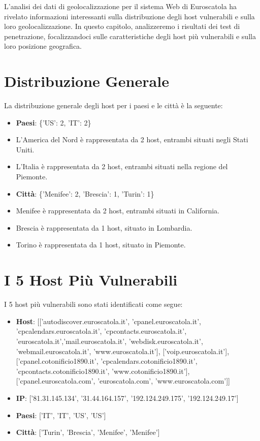 L'analisi dei dati di geolocalizzazione per il sistema Web di Euroscatola ha rivelato informazioni interessanti sulla distribuzione degli host vulnerabili e sulla loro geolocalizzazione. In questo capitolo, analizzeremo i risultati dei test di penetrazione, focalizzandoci sulle caratteristiche degli host più vulnerabili e sulla loro posizione geografica.

\section{Distribuzione Generale}

La distribuzione generale degli host per i paesi e le città è la seguente:
\begin{itemize}
\item \textbf{Paesi}: \{'US': 2, 'IT': 2\}
\item L'America del Nord è rappresentata da 2 host, entrambi situati negli Stati Uniti.
\item L'Italia è rappresentata da 2 host, entrambi situati nella regione del Piemonte.
\item \textbf{Città}: \{'Menifee': 2, 'Brescia': 1, 'Turin': 1\}
\item Menifee è rappresentata da 2 host, entrambi situati in California.
\item Brescia è rappresentata da 1 host, situato in Lombardia.
\item Torino è rappresentata da 1 host, situato in Piemonte.
\end{itemize}
\section{I 5 Host Più Vulnerabili}

I 5 host più vulnerabili sono stati identificati come segue:
\begin{itemize}
\item \textbf{Host}: [['autodiscover.euroscatola.it', 'cpanel.euroscatola.it', 'cpcalendars.euroscatola.it', 'cpcontacts.euroscatola.it', 'euroscatola.it','mail.euroscatola.it', 'webdisk.euroscatola.it', 'webmail.euroscatola.it', 'www.euroscatola.it'], ['voip.euroscatola.it'], ['cpanel.cotonificio1890.it', 'cpcalendars.cotonificio1890.it', 'cpcontacts.cotonificio1890.it', 'www.cotonificio1890.it'], ['cpanel.euroscatola.com', 'euroscatola.com', 'www.euroscatola.com']]
\item \textbf{IP}: ['81.31.145.134', '31.44.164.157', '192.124.249.175', '192.124.249.17']
\item \textbf{Paesi}: ['IT', 'IT', 'US', 'US']
\item \textbf{Città}: ['Turin', 'Brescia', 'Menifee', 'Menifee']
\end{itemize}
